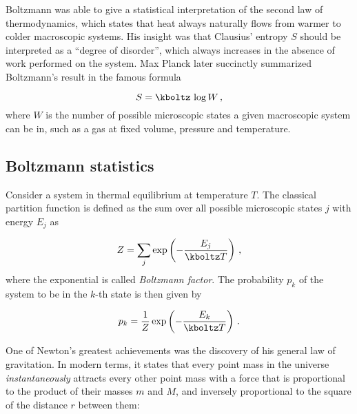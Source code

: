 \documentclass{scrartcl}
\begin{document}
Boltzmann was able to give a statistical interpretation of the second law of thermodynamics, which states that heat always naturally flows from warmer to colder macroscopic systems. His insight was that Clausius' entropy $S$ should be interpreted as a \enquote{degree of disorder}, which always increases in the absence of work performed on the system. Max Planck later succinctly summarized Boltzmann's result in the famous formula

\begin{equation*}\label{eq:ideal-nr}
  S=\kboltz\, \log W\,,
\end{equation*}
%
where $W$ is the number of possible microscopic states a given macroscopic system can be in, such as a gas at fixed volume, pressure and temperature.


\subsection*{Boltzmann statistics}

Consider a system in thermal equilibrium at temperature $T$. The classical partition function is defined as the sum over all possible microscopic states $j$ with energy $E_j$ as

\begin{equation*}\label{eq:ideal-nr}
  Z=\sum_j \exp \left(-\frac{E_j}{\kboltz T}\right)\,,
\end{equation*}
%
where the exponential is called \emph{Boltzmann factor}. The probability $p_k$ of the system to be in the $k$-th state is then given by

\begin{equation*}\label{eq:ideal-nr}
  p_k=\frac{1}{Z} \exp \left(-\frac{E_k}{\kboltz T}\right)\,.
\end{equation*}



\newpage {}
\label{sec:1000}

One of Newton's greatest achievements was the discovery of his general law of gravitation. In modern terms, it states that every point mass in the universe \emph{instantaneously} attracts every other point mass with a force that is proportional to the product of their masses $m$ and $M$, and inversely proportional to the square of the distance $r$ between them:
\end{document}
